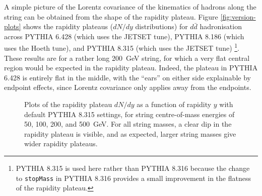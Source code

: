 \documentclass[12pt,a4paper]{report}
\begin{document}

A simple picture of the Lorentz covariance of the kinematics of hadrons along the string can be obtained from the shape of the rapidity plateau. Figure \ref{fig:version-plots} shows the rapidity plateaus ($dN/dy$ distributions) for $d\bar{d}$ hadronisation across PYTHIA 6.428 (which uses the JETSET tune), PYTHIA 8.186 (which uses the Hoeth tune), and PYTHIA 8.315 (which uses the JETSET tune) \footnote{PYTHIA 8.315 is used here rather than PYTHIA 8.316 because the change to \texttt{stopMass} in PYTHIA 8.316 provides a small improvement in the flatness of the rapidity plateau.}. These results are for a rather long \qty{200}{\giga\electronvolt} string, for which a very flat central region would be expected in the rapidity plateau. Indeed, the plateau in PYTHIA 6.428 is entirely flat in the middle, with the ``ears'' on either side explainable by endpoint effects, since Lorentz covariance only applies away from the endpoints.

\begin{figure}
  \centering
  \begin{minipage}[t]{0.49\linewidth}
    \centering
    
    \caption{Plots of the rapidity plateau $dN/dy$ as a function of rapidity $y$ in PYTHIA 8.315 across the Monash, JETSET, and Hoeth tunes \protect\footnotemark. Separate plots are shown for the Monash tune in the versions PYTHIA 8.315 and PYTHIA 8.316, between which \texttt{stopMass} was changed from 1.0 to 0.8. This has the effect of making the rapidity plateau slightly more flat.  For the JETSET tune, \texttt{stopMass} is set to 0.8 to match the behaviour of PYTHIA 6. However, the rapidity plateau for the JETSET tune is not the same as that in Figure \ref{fig:version-plots}. This is because of a bug introduced in PYTHIA 8 that was not present in PYTHIA 6. }
    \label{fig:dNdy-different-tunes}
  \end{minipage}
  \hfill
  \begin{minipage}[t]{0.49\linewidth}
    \centering
    
    \caption{Plots of the rapidity plateau $dN/dy$ as a function of rapidity $y$ with default PYTHIA 8.315 settings, for string centre-of-mass energies of 50, 100, 200, and \qty{500}{\giga\electronvolt}. For all string masses, a clear dip in the rapidity plateau is visible, and as expected, larger string masses give wider rapidity plateaus.}
    \label{fig:dNdy-string-masses}
  \end{minipage}
\end{figure}
\end{document}
